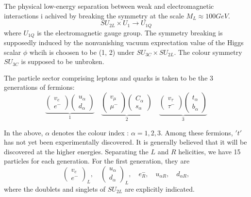 The physical low-energy separation between weak and electromagnetic interactions i  achived by breaking the symmetry at the scale $M_{L} \approx 100 GeV$.
$$
SU_{2L} \times U_{1} \rightarrow  U_{1Q}
$$
where $U_{1Q}$ is the electromagnetic gauge group. The symmetry breaking is supposedly induced by the nonvanishing vacuum exprectation value of the Higgs scalar $\phi$ whcih is choosen to be (1, 2) under $SU_{3C} \times SU_{2L}$. The colour symmetry $SU_{3C}$ is supposed to be unbroken.

The particle sector comprising leptons and quarks is taken to be the 3 generations of fermions:
\begin{equation*}
\underbrace{\begin{pmatrix}v_{e} \\ e^{-}  \end{pmatrix} \begin{pmatrix}u_{\alpha} \\ d_{\alpha}  \end{pmatrix}  }_{1}\quad \underbrace{\begin{pmatrix}v_{\mu} \\ \mu^{-}  \end{pmatrix} \begin{pmatrix}C_{\alpha} \\ s_{\alpha}  \end{pmatrix}  }_{2}\quad \underbrace{\begin{pmatrix}v_{\tau} \\ \tau^{-}  \end{pmatrix} \begin{pmatrix}t_{\alpha} \\ b_{\alpha}  \end{pmatrix}  }_{3}
\end{equation*}

In the above, $\alpha$ denotes the colour index : $\alpha = 1,2,3$. Among these fermions, $'t'$ has not yet been experimentally discovered. It is generally believed that it will be discovered at the higher energies. Separating the $L$ and $R$ helicities, we have 15 particles for each generation. For the first generation, they are 
\begin{equation*}
\begin{pmatrix}
v_{e} \\ e^{-}
\end{pmatrix}_{L}
,\quad
\begin{pmatrix}
u_{\alpha} \\ d_{\alpha}
\end{pmatrix}_{L},\quad
e^{-}_{R},\quad u_{\alpha R},\quad d_{\alpha R},
\end{equation*}
where the doublets and singlets of $SU_{2L}$ are explicitly indicated.

